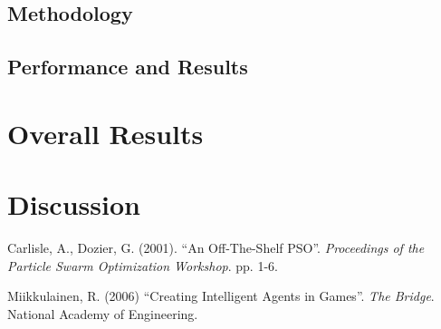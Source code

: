 \documentclass[12pt]{article}
\begin{document}
\subsection{Methodology}
\subsection{Performance and Results}

\section{Overall Results}

\section{Discussion}


\begin{thebibliography}{99}

 Carlisle, A., Dozier, G. (2001). ``An Off-The-Shelf PSO''.
  {\it Proceedings of the Particle Swarm Optimization Workshop}. pp. 1-6. 

 Miikkulainen, R. (2006) ``Creating Intelligent
  Agents in Games''.  {\it The Bridge}.  National Academy of Engineering.

\end{thebibliography}
\end{document}
